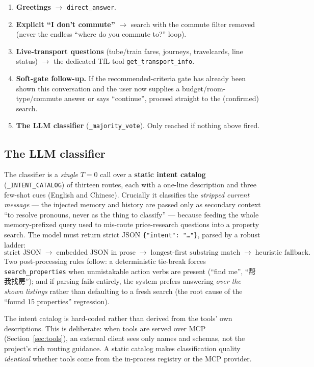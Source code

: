 \documentclass[11pt,a4paper]{article}
\newcommand{\code}[1]{\texttt{\small #1}}
\begin{document}
\begin{enumerate}[leftmargin=1.6em,itemsep=3pt]
  \item \textbf{Greetings} $\to$ \code{direct\_answer}.

  \item \textbf{Explicit ``I don't commute''} $\to$ search with the commute filter
  removed (never the endless ``where do you commute to?'' loop).

  \item \textbf{Live-transport questions} (tube/train fares, journeys, travelcards,
  line status) $\to$ the dedicated TfL tool \code{get\_transport\_info}.

  \item \textbf{Soft-gate follow-up.} If the recommended-criteria gate has already
  been shown this conversation and the user now supplies a budget/room-type/commute
  answer or says ``continue'', proceed straight to the (confirmed) search.

  \item \textbf{The LLM classifier} (\code{\_majority\_vote}). Only reached if nothing
  above fired.
\end{enumerate}

\subsection{The LLM classifier}
The classifier is a \emph{single} $T=0$ call over a \textbf{static intent catalog}
(\code{\_INTENT\_CATALOG}) of thirteen routes, each with a one-line description and
three few-shot cues (English and Chinese). Crucially it classifies the \emph{stripped
current message} --- the injected memory and history are passed only as secondary
context ``to resolve pronouns, never as the thing to classify'' --- because feeding
the whole memory-prefixed query used to mis-route price-research questions into a
property search. The model must return strict JSON \code{\{"intent": "\dots"\}}, parsed
by a robust ladder:
\[
  \text{strict JSON} \;\to\; \text{embedded JSON in prose} \;\to\;
  \text{longest-first substring match} \;\to\; \text{heuristic fallback}.
\]
Two post-processing rules follow: a deterministic tie-break forces
\code{search\_properties} when unmistakable action verbs are present (``find me'',
``帮我找房''); and if parsing fails entirely, the
system prefers answering \emph{over the shown listings} rather than defaulting to a
fresh search (the root cause of the ``found 15 properties'' regression).

\begin{keybox}
The intent catalog is hard-coded rather than derived from the tools' own
descriptions. This is deliberate: when tools are served over MCP
(Section~\ref{sec:tools}), an external client sees only names and schemas, not the
project's rich routing guidance. A static catalog makes classification quality
\emph{identical} whether tools come from the in-process registry or the MCP provider.
\end{keybox}
\end{document}

